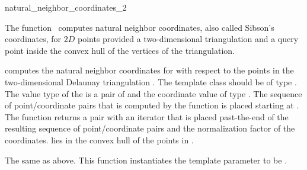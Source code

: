 
\begin{ccRefFunction}{natural_neighbor_coordinates_2}  %

\ccDefinition
  
The function \ccRefName\ computes natural neighbor coordinates, also
called Sibson's coordinates, for $2D$ points provided a two-dimensional
triangulation and a query point inside the convex hull of the vertices
of the triangulation.



 {
  computes the natural neighbor coordinates for  with respect
  to the points in the two-dimensional Delaunay triangulation .
  The template class  should be of type
  .  The value type of the
   is a pair of  and the
  coordinate value of type . The sequence of
  point/coordinate pairs that is computed by the function is placed
  starting at . The function returns a pair with an iterator
  that is placed past-the-end of the resulting sequence of
  point/coordinate pairs and the normalization factor of the
  coordinates.
  \ccPrecond %
   lies in the convex hull of the
  points in .
  }  

%
{The same as above. This function instantiates the template parameter
   to be .}



\end{ccRefFunction}

